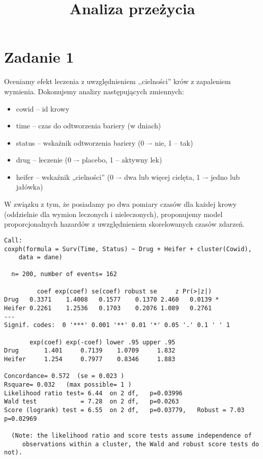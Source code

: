 \documentclass[]{article}
\title{Analiza przeżycia}
\author{}
\date{}
\begin{document}
\maketitle


\thispagestyle{fancy} \section{Zadanie 1}

Oceniamy efekt leczenia z uwzględnieniem ,,cielności'' krów z zapaleniem
wymienia. Dokonujemy analizy następujących zmiennych:

\begin{itemize}
\item cowid -- id krowy
\item time -- czas do odtworzenia bariery (w dniach)
\item status -- wskaźnik odtworzenia bariery (0 –- nie, 1 -- tak)
\item drug -- leczenie (0 –- placebo, 1 -- aktywny lek)
\item heifer -- wskaźnik „cielności” (0 –- dwa lub więcej cielęta, 1 –- jedno lub
jałówka)
\end{itemize}

W związku z tym, że posiadamy po dwa pomiary czasów dla każdej krowy
(oddzielnie dla wymion leczonych i nieleczonych), proponujemy model
proporcjonalnych hazardów z uwzględnieniem skorelowanych czasów zdarzeń.

\begin{verbatim}
Call:
coxph(formula = Surv(Time, Status) ~ Drug + Heifer + cluster(Cowid), 
    data = dane)

  n= 200, number of events= 162 

         coef exp(coef) se(coef) robust se     z Pr(>|z|)  
Drug   0.3371    1.4008   0.1577    0.1370 2.460   0.0139 *
Heifer 0.2261    1.2536   0.1703    0.2076 1.089   0.2761  
---
Signif. codes:  0 '***' 0.001 '**' 0.01 '*' 0.05 '.' 0.1 ' ' 1

       exp(coef) exp(-coef) lower .95 upper .95
Drug       1.401     0.7139    1.0709     1.832
Heifer     1.254     0.7977    0.8346     1.883

Concordance= 0.572  (se = 0.023 )
Rsquare= 0.032   (max possible= 1 )
Likelihood ratio test= 6.44  on 2 df,   p=0.03996
Wald test            = 7.28  on 2 df,   p=0.0263
Score (logrank) test = 6.55  on 2 df,   p=0.03779,   Robust = 7.03  p=0.02969

  (Note: the likelihood ratio and score tests assume independence of
     observations within a cluster, the Wald and robust score tests do not).
\end{verbatim}
\end{document}
